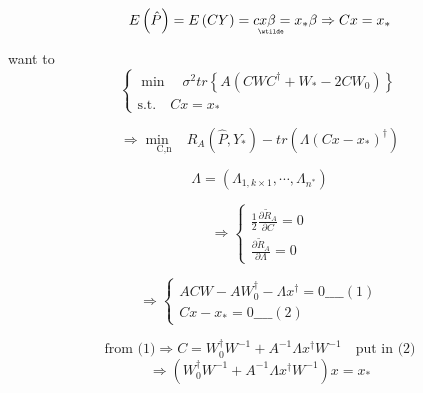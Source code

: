 \documentclass{article}
\begin{document}
\begin{equation*}
E\left( \hat{P}\right) =E\left( CY\right) =cx%
\underaccent{\wtilde}{\beta}%
=x_{\ast }\beta \Rightarrow Cx=x_{\ast }
\end{equation*}

want to%
\begin{equation*}
\left\{ 
\begin{array}{c}
\min \quad \sigma ^{2}tr\left\{ A\left( CWC^{\dagger }+W_{\ast
}-2CW_{0}\right) \right\} \\ 
\text{s.t.}\quad Cx=x_{\ast }%
\end{array}%
\right.
\end{equation*}

\begin{equation*}
\Rightarrow \underset{\text{C,n}}{\min \quad }R_{A}\left( \hat{P},Y_{\ast
}\right) -tr\left( \Lambda \left( Cx-x_{\ast }\right) ^{\dagger }\right)
\end{equation*}

\begin{equation*}
\Lambda =\left( \Lambda _{1,k\times 1},\cdots ,\Lambda _{n^{\ast }}\right)
\end{equation*}

\begin{equation*}
\Rightarrow \left\{ 
\begin{array}{c}
\frac{1}{2}\frac{\partial \tilde{R}_{A}}{\partial C}=0 \\ 
\frac{\partial \tilde{R}_{A}}{\partial \Lambda }=0%
\end{array}%
\right.
\end{equation*}

\begin{equation*}
\Rightarrow \left\{ 
\begin{array}{c}
ACW-AW_{0}^{\dagger }-\Lambda x^{\dagger }=0\_\_\_\_\left( 1\right) \\ 
Cx-x_{\ast }=0\_\_\_\_\left( 2\right)%
\end{array}%
\right.
\end{equation*}

\begin{equation*}
\text{from (1)}\Rightarrow C=W_{0}^{\dagger }W^{-1}+A^{-1}\Lambda x^{\dagger
}W^{-1}\quad \text{put in (2)}
\end{equation*}%
\begin{equation*}
\Rightarrow \left( W_{0}^{\dagger }W^{-1}+A^{-1}\Lambda x^{\dagger
}W^{-1}\right) x=x_{\ast }
\end{equation*}
\end{document}
